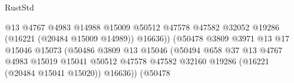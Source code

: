 \begin{lexlean}{RustStd}
\begin{coremodule}
                                                            @13
                                                            @4767
                                                            @4983
                                                            @14988
                                                            @15009
                                                            @50512
                                                            @47578
                                                            @47582
                                                            @32052
                                                            @19286
                                                            (@16221 (@20484 @15009 @14989))
                                                            @16636))
                                                        (@50478
                                                          @3809
                                                          @3971
                                                          @13
                                                          @17
                                                          @15046
                                                          @15073
                                                          (@50486
                                                            @3809
                                                            @13
                                                            @15046
                                                            (@50494
                                                              @658
                                                              @37
                                                              @13
                                                              @4767
                                                              @4983
                                                              @15019
                                                              @15041
                                                              @50512
                                                              @47578
                                                              @47582
                                                              @32160
                                                              @19286
                                                              (@16221 (@20484 @15041 @15020))
                                                              @16636))
                                                          (@50478

\end{coremodule}
\end{lexlean}

